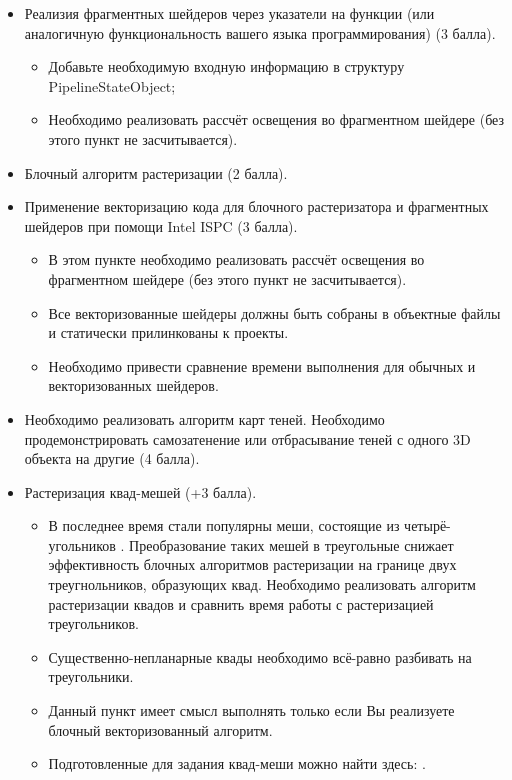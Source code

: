 \documentclass[12pt,subf,href,colorlinks=true]{article}
\begin{document}
\begin{itemize}
	\item Реализия фрагментных шейдеров через указатели на функции (или аналогичную функциональность вашего языка программирования) (3 балла).
	
	\begin{itemize}
	  \item Добавьте необходимую входную информацию в структуру PipelineStateObject;	
	  \item Необходимо реализовать рассчёт освещения во фрагментном шейдере (без этого пункт не засчитывается).
	\end{itemize}

    \item Блочный алгоритм растеризации (2 балла).
    
    \item Применение векторизацию кода для блочного растеризатора и фрагментных шейдеров при помощи Intel ISPC (3 балла).
    
    \begin{itemize}
      \item В этом пункте необходимо реализовать рассчёт освещения во фрагментном шейдере (без этого пункт не засчитывается).
      \item Все векторизованные шейдеры должны быть собраны в объектные файлы и статически прилинкованы к проекты.
      \item Необходимо привести сравнение времени выполнения для обычных и векторизованных шейдеров.
    \end{itemize}
	
	\item Необходимо реализовать алгоритм карт теней. Необходимо продемонстрировать самозатенение или отбрасывание теней с одного 3D объекта на другие (4 балла).
	
	\item Растеризация квад-мешей  (+3 балла).
	\begin{itemize}
	  \item В последнее время стали популярны меши, состоящие из четырё-угольников \cite{quadmeshes_about}. Преобразование таких мешей в треугольные снижает эффективность блочных алгоритмов растеризации на границе двух треугнольников, образующих квад. Необходимо реализовать алгоритм растеризации квадов и сравнить время работы с растеризацией треугольников.
	  
	  \item Существенно-непланарные квады необходимо всё-равно разбивать на треугольники.
	  
	  \item Данный пункт имеет смысл выполнять только если Вы реализуете блочный векторизованный алгоритм. 
	  
	  \item Подготовленные для задания квад-меши можно найти здесь: \cite{quadmeshes}. 
	   
	\end{itemize}
	
\end{itemize}
\end{document}
